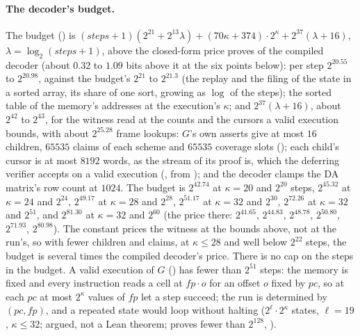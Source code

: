 \documentclass[11pt]{article}
\begin{document}
\paragraph{The decoder's budget.} The budget () is
$(\mathit{steps} + 1)(2^{21} + 2^{13}\lambda) + (70\kappa + 374)\cdot 2^\kappa + 2^{37}(\lambda + 16)$,
$\lambda = \log_2(\mathit{steps} + 1)$, above the closed-form price  proves of the
compiled decoder (about $0.32$ to $1.09$ bits above it at the six points below): per step $2^{20.55}$ to $2^{20.98}$, against the budget's $2^{21}$ to $2^{21.3}$ (the replay
and the filing of the state in a sorted array, its share of one sort, growing as $\log$ of the
steps); the sorted table of the memory's addresses at the execution's $\kappa$; and
$2^{37}(\lambda + 16)$, about $2^{42}$ to $2^{43}$, for the witness read at the counts and the
cursors a valid execution bounds, with about $2^{25.28}$ frame lookups: $G$'s own asserts give at
most $16$ children, $65535$ claims of each scheme and $65535$ coverage slots ();
each child's cursor is at most $8192$ words, as the stream of its proof is, which the deferring
verifier accepts on a valid execution (, from
); and the decoder clamps the DA matrix's row count at $1024$. The
budget is $2^{42.74}$ at $\kappa = 20$ and $2^{20}$ steps, $2^{45.32}$ at $\kappa = 24$ and
$2^{24}$, $2^{49.17}$ at $\kappa = 28$ and $2^{28}$, $2^{51.17}$ at $\kappa = 32$ and $2^{30}$,
$2^{72.26}$ at $\kappa = 32$ and $2^{51}$, and $2^{81.30}$ at $\kappa = 32$ and $2^{60}$ (the price
there: $2^{41.65}$, $2^{44.83}$, $2^{48.78}$, $2^{50.80}$, $2^{71.93}$, $2^{80.98}$). The constant
prices the witness at the bounds above, not at the run's, so with fewer children and claims, at
$\kappa \le 28$ and well below $2^{22}$ steps, the budget is several times the compiled decoder's
price. There is no cap on the steps in the budget. A valid execution of $G$ ()
has fewer than $2^{51}$ steps: the memory is fixed and every instruction reads a cell at
$\mathit{fp}\cdot o$ for an offset $o$ fixed by $\mathit{pc}$, so at each $\mathit{pc}$ at most
$2^\kappa$ values of $\mathit{fp}$ let a step succeed; the run is determined by
$(\mathit{pc}, \mathit{fp})$, and a repeated state would loop without halting
($2^\ell\cdot 2^\kappa$ states, $\ell = 19$, $\kappa \le 32$; argued, not a Lean theorem;
 proves fewer than $2^{128}$, ).
\end{document}
